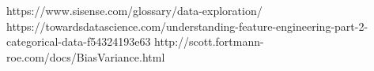 \documentclass[notes]{beamer}
\begin{document}
\begin{frame}
	\begin{thebibliography}{9}
		 https://www.sisense.com/glossary/data-exploration/
		https://towardsdatascience.com/understanding-feature-engineering-part-2-categorical-data-f54324193e63
		http://scott.fortmann-roe.com/docs/BiasVariance.html
	\end{thebibliography}
\end{frame}
\end{document}
